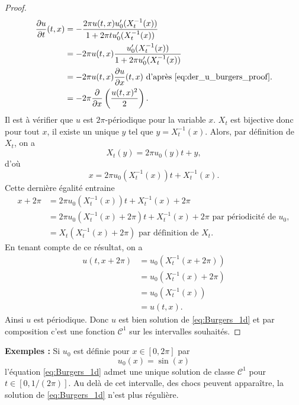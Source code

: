 \begin{proof}
\begin{align*}
\dfrac{\partial u}{\partial t}(t,x) & = - \dfrac{2 \pi u(t,x) u_0'(X_t^{-1}(x))}{1 + 2 \pi t u_0'(X_t^{-1}(x))} \\
	& = - 2 \pi u(t,x) \dfrac{u_0'(X_t^{-1}(x))}{1 + 2 \pi u_0'(X_t^{-1}(x))} \\
	& = - 2 \pi u(t,x) \dfrac{\partial u}{\partial x}(t,x) \text{ d'après \eqref{eq:der_u_burgers_proof}.} \\
	& = - 2 \pi \dfrac{\partial}{\partial x}\left( \dfrac{u(t,x)^2}{2} \right).
\end{align*}
Il est à vérifier que $u$ est $2 \pi$-périodique pour la variable $x$.
$X_t$ est bijective donc pour tout $x$, il existe un unique $y$ tel que $y = X_t^{-1}(x)$. Alors, par définition de $X_t$, on a
\begin{equation}
X_t(y) = 2 \pi u_0(y)t + y,
\end{equation}
d'où
\begin{equation}
x = 2 \pi u_0(X_t^{-1}(x))t + X_t^{-1}(x).
\end{equation}
Cette dernière égalité entraine 
\begin{align*}
x + 2 \pi & = 2 \pi u_0( X_t^{-1}(x))t + X_t^{-1}(x) + 2 \pi \\
	& = 2 \pi u_0( X_t^{-1}(x) + 2 \pi)t + X_t^{-1}(x) + 2 \pi \text{ par périodicité de } u_0,\\
	& = X_t(X_t^{-1}(x) + 2 \pi) \text{ par définition de } X_t.
\end{align*}
En tenant compte de ce résultat, on a
\begin{align*}
u(t,x+ 2 \pi) & = u_0(X_t^{-1}(x+2\pi)) \\
	& = u_0(X_t^{-1}(x) + 2 \pi) \\
	& = u_0(X_t^{-1}(x)) \\
	& = u(t,x).
\end{align*}
Ainsi $u$ est périodique. Donc $u$ est bien solution de \eqref{eq:Burgers_1d} et par composition c'est une fonction $\mathcal{C}^1$ sur les intervalles souhaités.
\end{proof}

\textbf{Exemples : }
Si $u_0$ est définie pour $x \in [0, 2 \pi]$ par 
\begin{equation}
u_0(x) = \sin (x)
\label{eq:burgers_expemple2}
\end{equation}
l'équation \eqref{eq:Burgers_1d} admet une unique solution de classe $\mathcal{C}^1$ pour $t \in [0, 1/(2\pi)]$. Au delà de cet intervalle, des chocs peuvent apparaître, la solution de \eqref{eq:Burgers_1d} n'est plus régulière.


